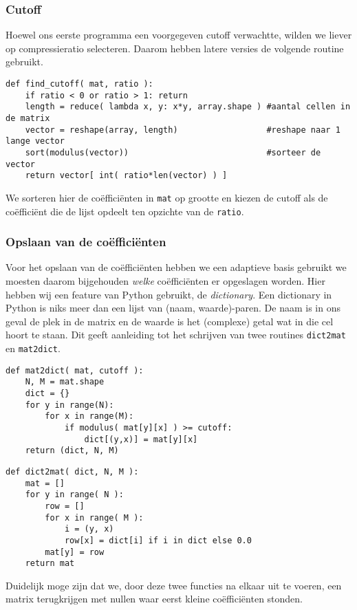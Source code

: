 \subsubsection{Cutoff}
Hoewel ons eerste programma een voorgegeven cutoff verwachtte, wilden we liever op compressieratio selecteren.
Daarom hebben latere versies de volgende routine gebruikt. 
\begin{lstlisting}[caption=Het vinden van een goede cutoff-waarde gegeven een gewenst compressieniveau]
def find_cutoff( mat, ratio ):
	if ratio < 0 or ratio > 1: return
	length = reduce( lambda x, y: x*y, array.shape ) #aantal cellen in de matrix 
	vector = reshape(array, length) 				 #reshape naar 1 lange vector
	sort(modulus(vector)) 							 #sorteer de vector
	return vector[ int( ratio*len(vector) ) ]
\end{lstlisting}
We sorteren hier de co\"effici\"enten in \texttt{mat} op grootte en kiezen de cutoff als de co\"effici\"ent
die de lijst opdeelt ten opzichte van de \texttt{ratio}.

\subsubsection{Opslaan van de co\"effici\"enten}
Voor het opslaan van de co\"effici\"enten hebben we een adaptieve basis gebruikt
we moesten daarom bijgehouden \emph{welke} co\"effici\"enten er opgeslagen worden. 
Hier hebben wij een feature van Python gebruikt, de \emph{dictionary}.
Een dictionary in Python is niks meer dan een lijst van (naam, waarde)-paren. 
De naam is in ons geval de plek in de matrix en de waarde is het (complexe) getal wat in die cel hoort te staan. 
Dit geeft aanleiding tot het schrijven van twee routines \texttt{dict2mat} en \texttt{mat2dict}.
\begin{lstlisting}[caption=Matrix naar dictionary conversie]
def mat2dict( mat, cutoff ):
	N, M = mat.shape
	dict = {}
	for y in range(N):
		for x in range(M):
			if modulus( mat[y][x] ) >= cutoff:
				dict[(y,x)] = mat[y][x]
	return (dict, N, M)
\end{lstlisting}

\begin{lstlisting}[caption=Dictionary naar matrix conversie]
def dict2mat( dict, N, M ):
	mat = []
	for y in range( N ):
		row = []
		for x in range( M ):
			i = (y, x)
			row[x] = dict[i] if i in dict else 0.0
		mat[y] = row
	return mat
\end{lstlisting}

Duidelijk moge zijn dat we, door deze twee functies na elkaar uit te voeren, een matrix terugkrijgen met nullen waar eerst kleine co\"effici\"enten stonden.

